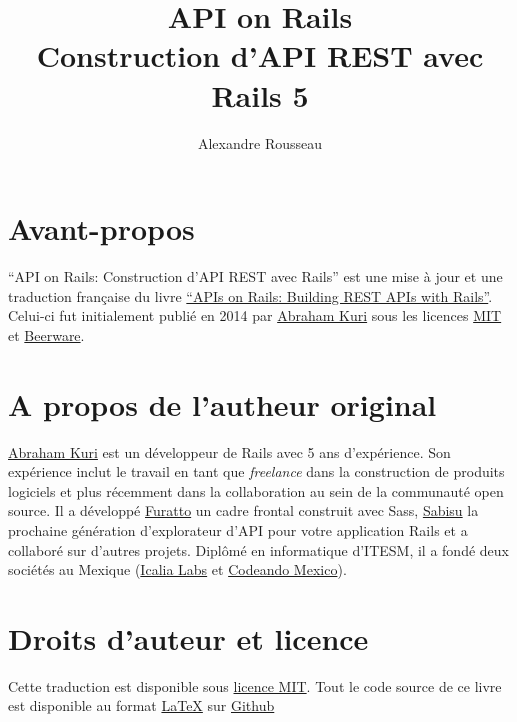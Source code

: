 \documentclass[]{report}
\title{\textbf{API on Rails}\\ Construction d'API REST avec Rails 5}
\author{Alexandre Rousseau}
\begin{document}
\maketitle
\newpage
\tableofcontents
\newpage
{}

\section{Avant-propos}

  \enquote{API on Rails: Construction d'API REST avec Rails} est une mise à jour et une traduction française du livre \href{http://apionrails.icalialabs.com/book/}{\enquote{APIs on Rails: Building REST APIs with Rails}}. Celui-ci fut initialement publié en 2014 par \href{https://twitter.com/kurenn}{Abraham Kuri} sous les licences \href{http://opensource.org/licenses/MIT}{MIT} et \href{http://people.freebsd.org/~phk/}{Beerware}.

  \section{A propos de l'autheur original}

    \href{https://twitter.com/kurenn}{Abraham Kuri} est un développeur de Rails avec 5 ans d'expérience. Son expérience inclut le travail en tant que \textit{freelance} dans la construction de produits logiciels et plus récemment dans la collaboration au sein de la communauté open source. Il a développé \href{http://icalialabs.github.io/furatto/}{Furatto} un cadre frontal construit avec Sass, \href{https://github.com/IcaliaLabs/sabisu-rails}{Sabisu} la prochaine génération d'explorateur d'API pour votre application Rails et a collaboré sur d'autres projets. Diplômé en informatique d'ITESM, il a fondé deux sociétés au Mexique (\href{http://icalialabs.com/}{Icalia Labs} et \href{http://codeandomexico.org/}{Codeando Mexico}).

  \section{Droits d'auteur et licence}

    Cette traduction est disponible sous \href{http://opensource.org/licenses/MIT}{licence MIT}. Tout le code source de ce livre est disponible au format \href{https://fr.wikipedia.org/wiki/LaTeX}{\LaTeX} sur \href{https://github.com/madeindjs/api\_on\_rails}{Github}
\end{document}
